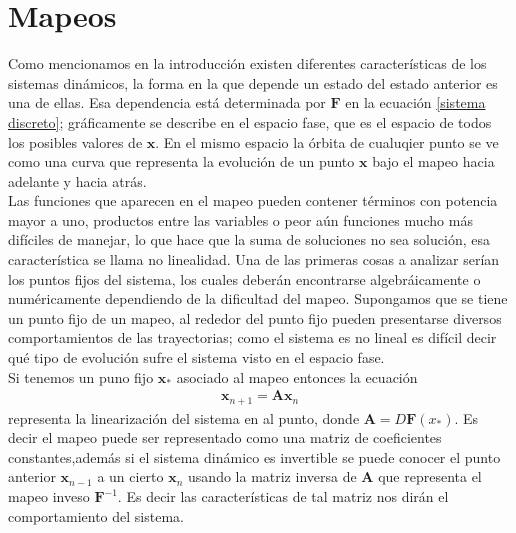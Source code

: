 \section{Mapeos}
Como mencionamos en la introducción existen diferentes características de los sistemas dinámicos, la forma en la que depende un estado del estado anterior es una de ellas. Esa dependencia está determinada por $\pmb F$ en la ecuación \ref{sistema discreto}; gráficamente se describe en el espacio fase, que es el espacio de todos los posibles valores de $\pmb x$. En el mismo espacio la órbita de cualuqier punto se ve como una curva que representa la evolución de un punto $\pmb x$ bajo el mapeo hacia adelante y hacia atrás. \\

Las funciones que aparecen en el mapeo pueden contener términos con potencia mayor a uno, productos entre las variables o peor aún funciones mucho más difíciles de manejar, lo que hace que la suma de soluciones no sea solución, esa característica se llama no linealidad. Una de las primeras cosas a analizar serían los puntos fijos del sistema, los cuales deberán encontrarse algebráicamente o numéricamente dependiendo de la dificultad del mapeo. Supongamos que se tiene un punto fijo de un mapeo, al rededor del punto fijo pueden presentarse diversos comportamientos de las trayectorias; como el sistema es no lineal es difícil decir qué tipo de evolución sufre el sistema visto en el espacio fase.\\


Si tenemos un puno fijo $\pmb x_{*}$ asociado al mapeo entonces la ecuación
\begin{eqnarray}
\pmb x_{n+1} =\mathbf{A}\pmb x_{n}
\end{eqnarray}
representa la linearización del sistema en al punto, donde $\mathbf{A}=D\pmb F(x_{*})$. Es decir el mapeo puede ser representado como una matriz de coeficientes constantes,además si el sistema dinámico es invertible se puede conocer el punto anterior $\pmb x_{n-1}$ a un cierto $\pmb x_{n}$ usando la matriz inversa de $\mathbf{A}$ que representa el mapeo inveso $\pmb F^{-1}$. Es decir las características de tal matriz nos dirán el comportamiento del sistema. \\

